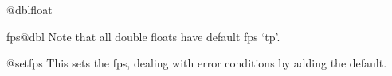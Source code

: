 %
  \begin{docCommand}{@dblfloat}{}
%
    \begin{teX}
\def\@dblfloat{%
  \if@twocolumn\let\reserved@a\@dbflt\else\let\reserved@a\@float\fi
  \reserved@a}
    \end{teX}
  \end{docCommand}
%
%    
  \begin{docCommand}{fps@dbl}{}
  Note that all double floats have default fps `tp'.
  \end{docCommand}
%  
  \begin{docCommand}{@setfps} {}
    This sets the fps, dealing with error conditions by adding
    the default.
%    
  \end{docCommand}
%
